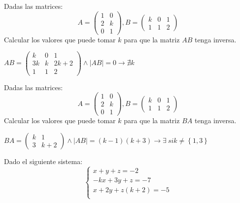 \documentclass[addpoints,spanish, 12pt,a4paper]{exam}
\begin{document}
\begin{questions}
\question[1] Dadas las matrices:
$$A=\left(\begin{matrix}1 & 0\\2 & k\\0 & 1\end{matrix}\right) ,
 B=\left(\begin{matrix}k & 0 & 1\\1 & 1 & 2\end{matrix}\right)$$
Calcular los valores que puede tomar $k$ para que la matriz $AB$ tenga inversa.
\begin{solution}
$AB=\left(\begin{matrix}k & 0 & 1\\3 k & k & 2 k + 2\\1 & 1 & 2\end{matrix}\right) \land |AB|=0 \to \nexists k$
\end{solution}

\question[1] Dadas las matrices:
$$A=\left(\begin{matrix}1 & 0\\2 & k\\0 & 1\end{matrix}\right) ,
 B=\left(\begin{matrix}k & 0 & 1\\1 & 1 & 2\end{matrix}\right)$$
Calcular los valores que puede tomar $k$ para que la matriz $BA$ tenga inversa.
\begin{solution}
$BA=\left(\begin{matrix}k & 1\\3 & k + 2\end{matrix}\right)
 \land |AB|=\left(k - 1\right) \left(k + 3\right)
 \to \exists \ si k\neq\left\{1,3\right\}$
\end{solution}

\question Dado el siguiente sistema:
$$\left\{ \begin{matrix}x + y + z = -2 \\ - k x + 3 y + z = -7 \\ x + 2 y + z \left(k + 2\right) = -5 \\ \end{matrix}\right.
$$
\begin{parts}

\end{parts}
\end{questions}
\end{document}
